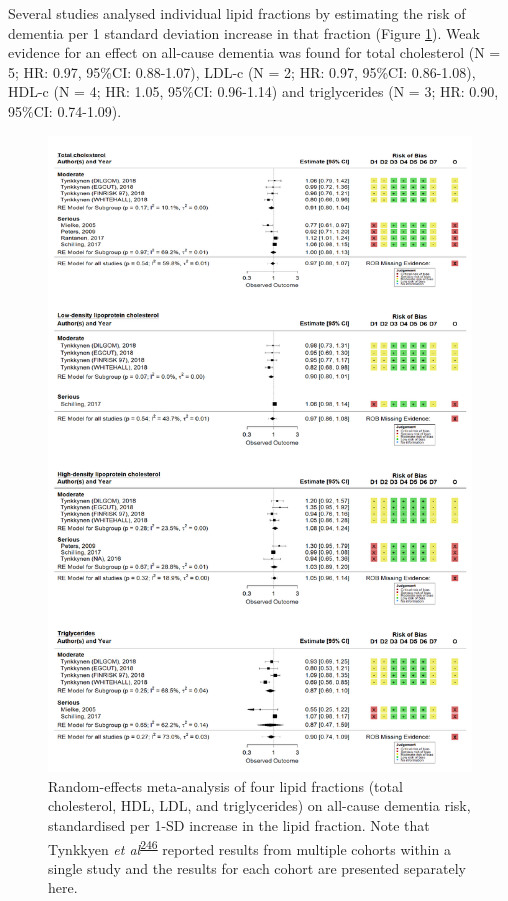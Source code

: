 \documentclass[a4paper, twoside]{templates/ociamthesis}
\begin{document}
Several studies analysed individual lipid fractions by estimating the risk of dementia per 1 standard deviation increase in that fraction (Figure \ref{fig:lipidFractionsDementia}). Weak evidence for an effect on all-cause dementia was found for total cholesterol (N = 5; HR: 0.97, 95\%CI: 0.88-1.07), LDL-c (N = 2; HR: 0.97, 95\%CI: 0.86-1.08), HDL-c (N = 4; HR: 1.05, 95\%CI: 0.96-1.14) and triglycerides (N = 3; HR: 0.90, 95\%CI: 0.74-1.09).





\begin{figure}[H]
\includegraphics[width=1\linewidth]{figures/sys-rev/fp_lipids_composite_Dementia} \caption[Random-effects meta-analysis of four lipid fractions on all-cause dementia]{Random-effects meta-analysis of four lipid fractions (total cholesterol, HDL, LDL, and triglycerides) on all-cause dementia risk, standardised per 1-SD increase in the lipid fraction. Note that Tynkkyen \emph{et al}\textsuperscript{\protect\hyperlink{ref-tynkkynen2018}{246}} reported results from multiple cohorts within a single study and the results for each cohort are presented separately here.}\label{fig:lipidFractionsDementia}
\end{figure}
\end{document}
